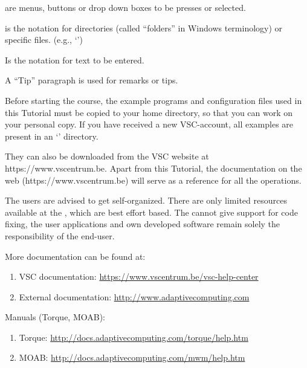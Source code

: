  are menus, buttons or drop down boxes to be presses or selected.

 is the notation for directories (called ``folders'' in
Windows terminology) or specific files. (e.g., `\homedir')

 Is the notation for text to be entered.

 A ``Tip'' paragraph is used for remarks or tips.


Before starting the course, the example programs and configuration files used in this \hpc Tutorial must be copied to your home directory, so that you can work on your personal copy. If you have received a new VSC-account, all examples are present in an `\examplesdir' directory.

\begin{prompt}
\end{prompt}

They can also be downloaded from the VSC website at https://www.vscentrum.be.  Apart from this \hpc Tutorial, the \hpc documentation on the web (https://www.vscentrum.be) will serve as a reference for all the \hpc operations.


 The users are advised to get self-organized. There are
only limited resources available at the \hpc, which are best effort based.
The \hpc cannot give support for code fixing, the user applications and own
developed software remain solely the responsibility of the end-user.

More documentation can be found at:

\begin{enumerate}
  \item  VSC documentation: \url{https://www.vscentrum.be/vsc-help-center}
  \item  External documentation: \url{http://www.adaptivecomputing.com}
\end{enumerate}

Manuals (Torque, MOAB):

\begin{enumerate}
  \item  Torque: \url{http://docs.adaptivecomputing.com/torque/help.htm}
  \item  MOAB: \url{http://docs.adaptivecomputing.com/mwm/help.htm}
\end{enumerate}

